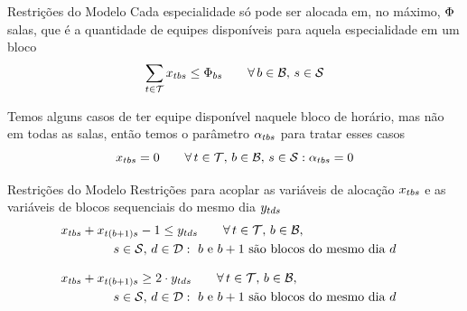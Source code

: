 \documentclass[10pt]{beamer}
\begin{document}
\begin{frame}{Restrições do Modelo}
    Cada especialidade só pode ser alocada em, no máximo, $\Phi$ salas, que é a quantidade de equipes disponíveis para aquela especialidade em um bloco
    \begin{equation}
    \label{eq:m2-6}
        \sum_{t \in \mathcal{T}} x_{tbs} \leq \Phi_{bs} \hspace{2em} \forall\, b \in \mathcal{B},\, s \in \mathcal{S}
    \end{equation}
    \vspace{2em}

    Temos alguns casos de ter equipe disponível naquele bloco de horário, mas não em todas as salas, então temos o parâmetro $\alpha_{tbs}$ para tratar esses casos
    \begin{equation}
    \label{eq:m2-7}
        x_{tbs} = 0 \hspace{2em} \forall\, t \in \mathcal{T},\,b \in \mathcal{B},\, s \in \mathcal{S} : \alpha_{tbs} = 0
    \end{equation}
\end{frame}
   

\begin{frame}{Restrições do Modelo}
    Restrições para acoplar as variáveis de alocação $x_{tbs}$ e as variáveis de blocos sequenciais do mesmo dia $y_{tds}$
    \begin{align}
    \label{eq:m2-8}
        &x_{tbs} + x_{t(b+1)s} - 1 \leq y_{tds} \hspace{2em} \forall\, t \in \mathcal{T},\, b \in \mathcal{B},&\\
        & \hspace{4em}\,s \in \mathcal{S},\, d \in \mathcal{D} : \text{ $b$ e $b+1$ são blocos do mesmo dia $d$}&\nonumber
    \end{align}

    \begin{align}
    \label{eq:m2-9}
        &x_{tbs} + x_{t(b+1)s} \geq 2 \cdot y_{tds} \hspace{2em} \forall\, t \in \mathcal{T},\, b \in \mathcal{B},&\\
        &\hspace{4em}\,s \in \mathcal{S},\, d \in \mathcal{D} : \text{ $b$ e $b+1$ são blocos do mesmo dia $d$}&\nonumber
    \end{align}
\end{frame}
\end{document}
